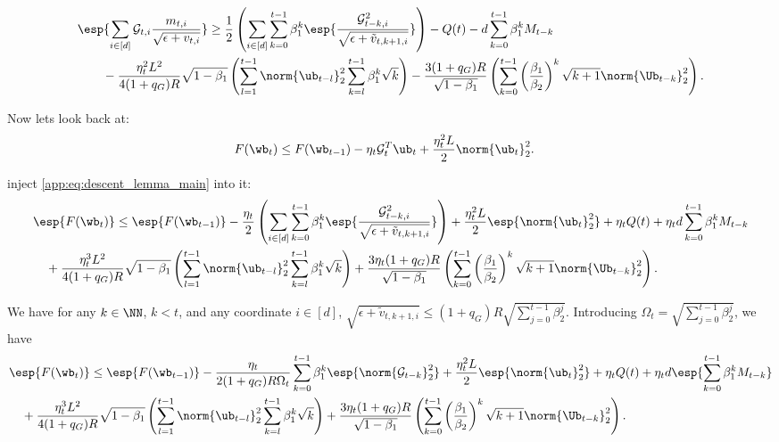 \documentclass[11pt, letterpaper]{article}
\begin{document}
\begin{equation}
\begin{aligned}
    &\esp{\sum_{i\in[d]}\mathcal{G}_{t, i}\frac{m_{t, i}}{\sqrt{\epsilon+v_{t, i}}}} \geq
   \frac{1}{2}\left(\sum_{i\in[d]} \sum_{k=0}^{t - 1} \beta_1^k
   \esp{
        \frac{\mathcal{G}_{t - k, i}^2}{\sqrt{\epsilon + \tilde{v}_{t, k + 1, i}}}}\right)-Q(t)-d\sum_{k=0}^{t-1}\beta_1^kM_{t-k}
\\
    &\qquad -
         \frac{\eta_t^2 L^2}{4 (1+q_G)R}\sqrt{1 - \beta_1}\left( \sum_{l=1}^{t-1}\norm{\ub_{t-l}}_2^2\sum_{k=l}^{t - 1}\beta_1^k \sqrt{k} \right)
        -
         \frac{3 (1+q_G)R}{\sqrt{1 - \beta_1}} \left(\sum_{k=0}^{t-1} \left(\frac{\beta_1}{\beta_2}\right)^k \sqrt{k+1}\norm{\Ub_{t-k}}_2^2\right).
  \label{app:eq:descent_lemma_main}
\end{aligned}
\end{equation}

Now lets look back at:
\begin{align*}
\nonumber
    &F(\wb_t)  \leq F(\wb_{t-1}) - \eta_t \mathcal{G}_t^T \ub_t
    + \frac{\eta_t^2 L}{2}\norm{\ub_t}^2_2.
\end{align*}

inject \eqref{app:eq:descent_lemma_main} into it:
\begin{align}
\nonumber
    &\esp{F(\wb_t)}  \leq \esp{F(\wb_{t-1})} -
    \frac{\eta_t}{2} \left(\sum_{i\in[d]} \sum_{k = 0}^{t-1}
  \beta_1^k \esp{
        \frac{\mathcal{G}_{t - k, i}^2}{ \sqrt{\epsilon + \tilde{v}_{t, k + 1, i}}}}\right)
  + \frac{\eta_t^2 L}{2}\esp{\norm{\ub_t}^2_2}+\eta_tQ(t)+\eta_td\sum_{k=0}^{t-1}\beta_1^kM_{t-k}
\\
    &\quad 
    +
           \frac{\eta_t^3 L^2}{4 (1+q_G)R}\sqrt{1 - \beta_1}\left( \sum_{l=1}^{t-1}\norm{\ub_{t-l}}_2^2\sum_{k=l}^{t - 1}\beta_1^k \sqrt{k} \right)
        +
         \frac{3\eta_t (1+q_G)R}{\sqrt{1 - \beta_1}} \left(\sum_{k=0}^{t-1} \left(\frac{\beta_1}{\beta_2}\right)^k \sqrt{k+1}\norm{\Ub_{t-k}}_2^2\right).
 \label{app:eq:common_first_main}
\end{align}

We have for any $k \in \NN$, $k < t$, and any coordinate $i\in [d]$,
$\sqrt{\epsilon+\tilde{v}_{t, k+1, i}} \leq (1+q_G)R \sqrt{\sum_{j=0}^{t-1} \beta_2^j}$.
Introducing $\Omega_t = \sqrt{\sum_{j=0}^{t-1} \beta_2^j}$,
we have
\begin{align}
\nonumber
    &\esp{F(\wb_t)}  \leq \esp{F(\wb_{t-1})} -
        \frac{\eta_t}{2 (1+q_G)R \Omega_t}\sum_{k = 0}^{t-1} \beta_1^k \esp{\norm{\mathcal{G}_{t -k}}_2^2}
       + \frac{\eta_t^2 L}{2}\esp{\norm{\ub_t}^2_2}+\eta_tQ(t)+\eta_td\esp{\sum_{k=0}^{t - 1}\beta_1^kM_{t-k}}
\\
    &\quad
    +
           \frac{\eta_t^3 L^2}{4 (1+q_G)R}\sqrt{1 - \beta_1}\left( \sum_{l=1}^{t-1}\norm{\ub_{t-l}}_2^2\sum_{k=l}^{t - 1}\beta_1^k \sqrt{k} \right)
        +
         \frac{3\eta_t (1+q_G)R}{\sqrt{1 - \beta_1}} \left(\sum_{k=0}^{t-1} \left(\frac{\beta_1}{\beta_2}\right)^k \sqrt{k+1}\norm{\Ub_{t-k}}_2^2\right).
 \label{app:eq:common_second_main}
\end{align}
\end{document}
